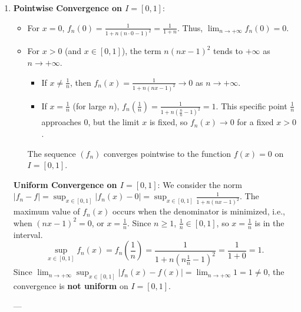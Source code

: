 \documentclass[12pt]{article}
\begin{document}
\begin{correctionbox}
\begin{enumerate}
    \item \textbf{Pointwise Convergence on $I=[0, 1]$}:
    \begin{itemize}
        \item For $x=0$, $f_n(0) = \frac{1}{1+n(n\cdot 0-1)^2} = \frac{1}{1+n}$. Thus, $\lim_{n \to +\infty} f_n(0) = 0$.
        \item For $x > 0$ (and $x \in [0, 1]$), the term $n(nx-1)^2$ tends to $+\infty$ as $n \to +\infty$.
        \begin{itemize}
            \item If $x \neq \frac{1}{n}$, then $f_n(x) = \frac{1}{1+n(nx-1)^2} \to 0$ as $n \to +\infty$.
            \item If $x = \frac{1}{n}$ (for large $n$), $f_n(\frac{1}{n}) = \frac{1}{1+n(\frac{n}{n}-1)^2} = 1$. This specific point $\frac{1}{n}$ approaches $0$, but the limit $x$ is fixed, so $f_n(x) \to 0$ for a fixed $x>0$.
        \end{itemize}
        The sequence $(f_n)$ converges pointwise to the function $f(x) = 0$ on $I=[0, 1]$.
    \end{itemize}
    \textbf{Uniform Convergence on $I=[0, 1]$}:
    We consider the norm $|f_n - f| = \sup_{x \in [0, 1]} |f_n(x) - 0| = \sup_{x \in [0, 1]} \frac{1}{1+n(nx-1)^2}$.
    The maximum value of $f_n(x)$ occurs when the denominator is minimized, i.e., when $(nx-1)^2 = 0$, or $x = \frac{1}{n}$.
    Since $n \geq 1$, $\frac{1}{n} \in [0, 1]$, so $x = \frac{1}{n}$ is in the interval.
    $$ \sup_{x \in [0, 1]} f_n(x) = f_n\left(\frac{1}{n}\right) = \frac{1}{1+n(n\frac{1}{n}-1)^2} = \frac{1}{1+0} = 1.$$
    Since $\lim_{n \to +\infty} \sup_{x \in [0, 1]} |f_n(x) - f(x)| = \lim_{n \to +\infty} 1 = 1 \neq 0$, the convergence is \textbf{not uniform} on $I=[0, 1]$.
    
    ---
    

\end{enumerate}
\end{correctionbox}
\end{document}
